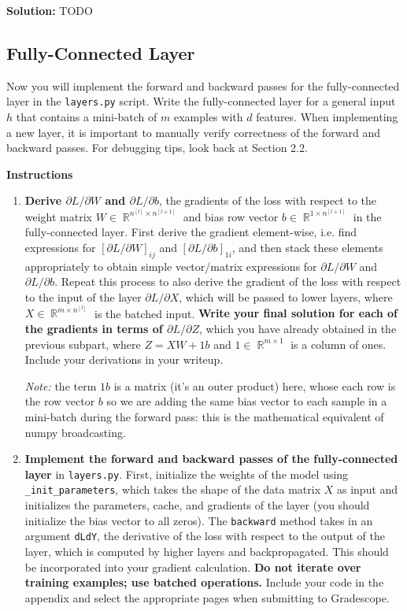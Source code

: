 \documentclass{article}
\DeclareMathOperator{\R}{\mathbb{R}}
\newenvironment{solution}{\color{blue} \smallskip \textbf{Solution:}}{}
\begin{document}
\begin{solution}
    TODO
\end{solution}

\newpage
\subsection{Fully-Connected Layer}
Now you will implement the forward and backward passes for the fully-connected layer in the \texttt{layers.py} script. 
Write the fully-connected layer for a general input $h$ that contains a mini-batch of $m$ examples with $d$ features. 
When implementing a new layer, it is important to manually verify correctness of the forward and backward passes. For debugging tips, look back at Section 2.2.

\textbf{Instructions}
\begin{enumerate}
    \item 
    \textbf{Derive $\partial L/\partial W$ and $\partial L/\partial b$}, the gradients of the loss with respect to the weight matrix $W \in \R^{n^{[l]} \times n^{[l+1]}}$ and bias row vector $b \in \R^{1 \times n^{[l+1]}}$ in the fully-connected layer. 
    First derive the gradient element-wise, i.e. find expressions for $\left[\partial L/\partial W\right]_{ij}$ and $\left[\partial L/\partial b\right]_{1i}$, and then stack these elements appropriately to obtain simple vector/matrix expressions for $\partial L/\partial W$ and $\partial L/\partial b$. 
    Repeat this process to also derive the gradient of the loss with respect to the input of the layer $\partial L/\partial X$, which will be passed to lower layers, where $X \in \R^{m \times n^{[l]}}$ is the batched input. 
    \textbf{Write your final solution for each of the gradients in terms of $\partial L/\partial Z$}, which you have already obtained in the previous subpart, where $Z = XW+1b$ and $1 \in \R^{m \times 1}$ is a column of ones. 
    Include your derivations in your writeup.
    
    \textit{Note:} the term $1b$ is a matrix (it's an outer product) here, whose each row is the row vector $b$ so we are adding the same bias vector to each sample in a mini-batch during the forward pass: this is the mathematical equivalent of numpy broadcasting.
    
    \item 
    \textbf{Implement the forward and backward passes of the fully-connected layer} in \texttt{layers.py}. 
    First, initialize the weights of the model using \texttt{\_init\_parameters}, which takes the shape of the data matrix $X$ as input and initializes the parameters, cache, and gradients of the layer (you should initialize the bias vector to all zeros). 
    The \texttt{backward} method takes in an argument \texttt{dLdY}, the derivative of the loss with respect to the output of the layer, which is computed by higher layers and backpropagated. 
    This should be incorporated into your gradient calculation. 
    \textbf{Do not iterate over training examples; use batched operations.} 
    Include your code in the appendix and select the appropriate pages when submitting to Gradescope.
\end{enumerate}
\end{document}
